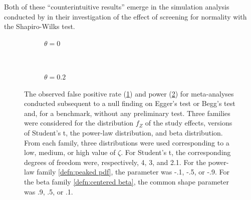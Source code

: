 \documentclass[12pt]{article}
\newcommand{\zdiff}{\zeta}
\begin{document}
Both of these ``counterintuitive results'' emerge in the simulation
analysis conducted by \citet{schucany:06} in their investigation of the effect of screening for
normality with the Shapiro-Wilks test.%
%
%
%
%
\setcounter{figure}{0}
\begin{figure}
 \begin{subfigure}{.5\textwidth}
    
    \caption{$\theta=0$}
\label{table:power 0}
  \end{subfigure}\\
  \begin{subfigure}{.5\textwidth}
	
    \caption{$\theta=0.2$}
		\label{table:power 0.2}
  \end{subfigure}
\caption{The observed false positive rate (\ref{table:power 0}) and power (\ref{table:power 0.2}) for meta-analyses conducted subsequent to a null finding on Egger's test or Begg's test and, for a benchmark, without any preliminary test. Three families were considered for the distribution $f_Z$ of the study effects, versions of Student's t, the power-law distribution, and beta distribution.  From each family, three distributions were used corresponding to a low, medium, or high value of $\zdiff$. For Student's t, the corresponding degrees of freedom were, respectively, 4, 3, and 2.1. For the power-law family \eqref{defn:peaked pdf}, the parameter was -.1, -.5, or -.9. For the beta family \eqref{defn:centered beta}, the common shape parameter was .9, .5, or .1.}\label{fig:table:power}
\end{figure}



\end{document}
